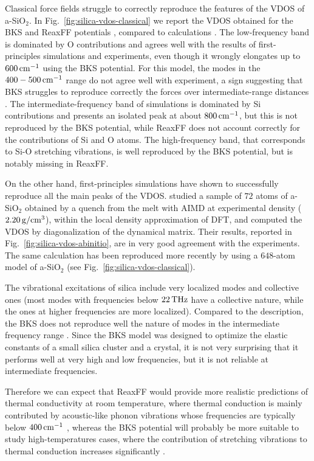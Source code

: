 Classical force fields struggle to correctly reproduce the features of the VDOS of a-SiO$_2$. In Fig.~\ref{fig:silica-vdos-classical} we report the VDOS obtained for the BKS and ReaxFF potentials \cite{Tian2017}, compared to \abinitio calculations \cite{Bhattarai2016}. 
The low-frequency band is dominated by O contributions and agrees well with the results of first-principles simulations and experiments, even though it wrongly elongates up to $600\,\mathrm{cm^{-1}}$ using the BKS potential. For this model, the modes in the $400-500\,\mathrm{cm^{-1}}$ range do not agree well with experiment, a sign suggesting that BKS struggles to reproduce correctly the forces over intermediate-range distances \cite{Vollmayr1996,Benoit2002}. 
The intermediate-frequency band of \abinitio simulations is dominated by Si contributions and presents an isolated peak at about $800\,\mathrm{cm^{-1}}$, but this is not reproduced by the BKS potential, while ReaxFF does not account correctly for the contributions of Si and O atoms. 
The high-frequency band, that corresponds to Si-O stretching vibrations, is well reproduced by the BKS potential, but is notably missing in ReaxFF. 

On the other hand, first-principles simulations have shown to successfully reproduce all the main peaks of the VDOS. \citet{Sarnthein1997} studied a sample of $72$ atoms of a-SiO$_2$ obtained by a quench from the melt with AIMD at experimental density ($2.20\,\mathrm{g/cm^3}$), within the local density approximation of DFT, and computed the VDOS by diagonalization of the dynamical matrix. Their results, reported in Fig.~\ref{fig:silica-vdos-abinitio}, are in very good agreement with the experiments. The same calculation has been reproduced more recently by \citet{Bhattarai2016} using a $648$-atom model of a-SiO$_2$ (see Fig.~\ref{fig:silica-vdos-classical}). 

The vibrational excitations of silica include very localized modes and collective ones (most modes with frequencies below $22\,\mathrm{THz}$ have a collective nature, while the ones at higher frequencies are more localized). Compared to the \abinitio description, the BKS does not reproduce well the nature of modes in the intermediate frequency range \cite{Benoit2002}. Since the BKS model was designed to optimize the elastic constants of a small silica cluster and a crystal, it is not very surprising that it performs well at very high and low frequencies, but it is not reliable at intermediate frequencies. 

Therefore we can expect that ReaxFF would provide more realistic predictions of thermal conductivity at room temperature, where thermal conduction is mainly contributed by acoustic-like phonon vibrations whose frequencies are typically below $400\,\mathrm{cm^{-1}}$ \cite{Bhattarai2016}, whereas the BKS potential will probably be more suitable to study high-temperatures cases, where the contribution of stretching vibrations to thermal conduction increases significantly \cite{Tian2017}. 


